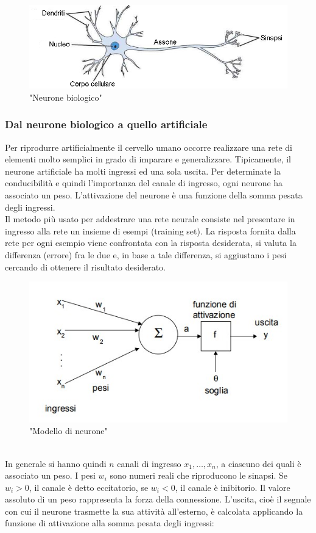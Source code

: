 \documentclass[a4paper,11pt]{article}
\begin{document}
    \begin{figure}[h]
        \centering
        \includegraphics[scale=0.7]{cervello.jpg}
        \caption{"Neurone biologico"}
    \end{figure}

    \subsubsection{Dal neurone biologico a quello artificiale}
    
    Per riprodurre artificialmente il cervello umano occorre realizzare
    una rete di elementi molto semplici in grado di imparare e generalizzare.
    Tipicamente, il neurone artificiale ha molti ingressi ed una sola uscita.
    Per determinate la conducibilità e quindi l'importanza del canale di ingresso, ogni neurone ha associato un peso. 
    L’attivazione del neurone è una funzione della somma pesata degli ingressi.\\[1in]
    Il metodo più usato per addestrare una rete neurale consiste nel presentare
    in ingresso alla rete un insieme di esempi (training set). 
    La risposta fornita dalla rete per ogni esempio viene confrontata con la risposta desiderata, si
    valuta la differenza (errore) fra le due e, in base a tale differenza, si
    aggiustano i pesi cercando di ottenere il risultato desiderato.
    \begin{figure}[h]
        \centering
        \includegraphics{neurone.jpg}
        \caption{"Modello di neurone"}
    \end{figure}
    \\In generale si hanno quindi $n$ canali di ingresso $x_1, …, x_n$, a ciascuno dei quali è associato un peso. 
    I pesi $w_i$ sono numeri reali che riproducono le sinapsi. Se $w_i > 0$, il canale è detto eccitatorio, se $w_i < 0$, il canale è inibitorio. 
    Il valore assoluto di un peso rappresenta la forza della connessione. 
    L’uscita, cioè il segnale con cui il neurone trasmette la sua attività
    all’esterno, è calcolata applicando la funzione di attivazione alla somma
    pesata degli ingressi:
    
\end{document}
